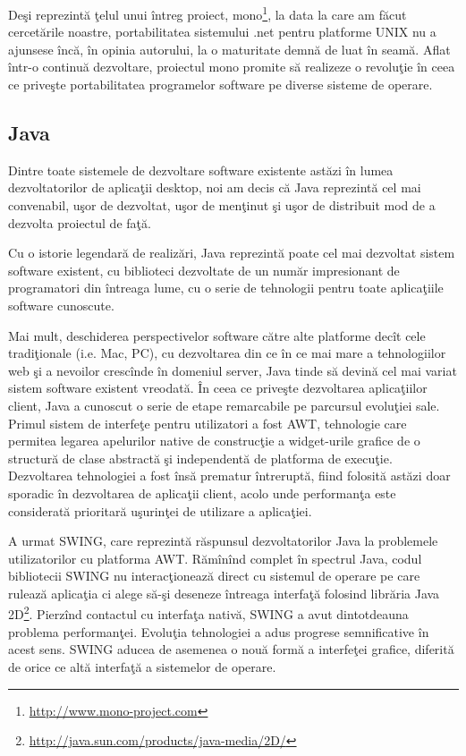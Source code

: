 Deşi reprezintă ţelul unui întreg proiect, 
mono\footnote{\url{http://www.mono-project.com}}, la data la care am făcut 
cercetările noastre, portabilitatea sistemului .net pentru platforme UNIX nu a 
ajunsese încă, în opinia autorului, la o maturitate demnă de luat în seamă. 
Aflat într-o continuă dezvoltare, proiectul mono promite să realizeze o 
revoluţie în ceea ce priveşte portabilitatea programelor software pe diverse 
sisteme de operare.

\subsection{Java}

Dintre toate sistemele de dezvoltare software existente astăzi în lumea 
dezvoltatorilor de aplicaţii desktop, noi am decis că Java reprezintă cel mai 
convenabil, uşor de dezvoltat, uşor de menţinut şi uşor de distribuit mod de a 
dezvolta proiectul de faţă.

Cu o istorie legendară de realizări, Java reprezintă poate cel mai dezvoltat 
sistem software existent, cu biblioteci dezvoltate de un număr impresionant de 
programatori din întreaga lume, cu o serie de tehnologii pentru toate 
aplicaţiile software cunoscute.

Mai mult, deschiderea perspectivelor software către alte platforme decît cele 
tradiţionale (i.e. Mac, PC), cu dezvoltarea din ce în ce mai mare a 
tehnologiilor web şi a nevoilor crescînde în domeniul server, Java tinde să 
devină cel mai variat sistem software existent vreodată. În ceea ce priveşte 
dezvoltarea aplicaţiilor client, Java a cunoscut o serie de etape remarcabile 
pe parcursul evoluţiei sale. Primul sistem de interfeţe pentru utilizatori a 
fost AWT, tehnologie care permitea legarea apelurilor native de construcţie a 
widget-urile grafice de o structură de clase abstractă şi independentă de 
platforma de execuţie. Dezvoltarea tehnologiei a fost însă prematur întreruptă, 
fiind folosită astăzi doar sporadic în dezvoltarea de aplicaţii client, acolo 
unde performanţa este considerată prioritară uşurinţei de utilizare a 
aplicaţiei.

A urmat SWING, care reprezintă răspunsul dezvoltatorilor Java la problemele 
utilizatorilor cu platforma AWT. Rămînînd complet în spectrul Java, codul 
bibliotecii SWING nu interacţionează direct cu sistemul de operare pe care 
rulează aplicaţia ci alege să-şi deseneze întreaga interfaţă folosind librăria 
Java 2D\footnote{\url{http://java.sun.com/products/java-media/2D/}}. Pierzînd 
contactul cu interfaţa nativă, SWING a avut dintotdeauna problema performanţei. 
Evoluţia tehnologiei a adus progrese semnificative în acest sens. SWING aducea 
de asemenea o nouă formă a interfeţei grafice, diferită de orice ce altă 
interfaţă a sistemelor de operare.

